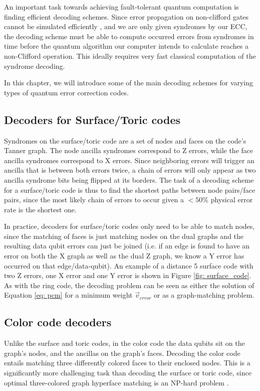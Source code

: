An important task towards achieving fault-tolerant quantum computation is
finding efficient decoding schemes.
Since error propagation on non-clifford gates cannot be simulated efficiently
\cite{gottesmanFaultTolerant}, and we are only given syndromes by our ECC,
the decoding scheme must be able to compute occurred 
errors from syndromes in time before the quantum algorithm our computer intends 
to calculate reaches a non-Clifford operation. This ideally requires very fast 
classical computation of the syndrome decoding.

In this chapter, we will introduce some of the main decoding schemes for
varying types of quantum error correction codes.

\subsection{Decoders for Surface/Toric codes}
Syndromes on the surface/toric code are a set of nodes and
faces on the code's Tanner graph. The node ancilla syndromes correspond to
Z errors, while the face ancilla syndromes correspond to X errors.
Since neighboring errors will trigger an ancilla that is between 
both errors twice, a chain of errors will only appear as two ancilla
syndrome bits being flipped at its borders.
The task of a decoding scheme for a surface/toric code is thus to
find the shortest paths between node pairs/face pairs, since the most likely
chain of errors to occur given a $<50\%$ physical error rate is the 
shortest one.

In practice, decoders for surface/toric codes only need to be able to
match nodes, since the matching of faces is just matching nodes on the 
dual graphs and the resulting data qubit errors can just be joined
(i.e. if an edge is found to have an error on both the X graph as well as the
dual Z graph, we know a Y error has occurred on that edge/data-qubit).
An example of a distance 5 surface code with two Z errors, one X error and
one Y error is shown in Figure \ref{fig: surface_code}.
As with the ring code, the decoding problem can be seen as either the
solution of Equation \ref{eq: pcm} for a minimum weight $\vec{v}_{error}$
or as a graph-matching problem.



\subsection{Color code decoders}
Unlike the surface and toric codes, in the color code the 
data qubits sit on the graph's nodes, and the ancillas on the 
graph's faces. Decoding the color code entails matching 
three differently colored faces to their enclosed nodes.
This is a significantly more challenging task than
decoding the surface or toric code, since optimal three-colored graph hyperface matching 
is an NP-hard problem \cite{delfosse}.

